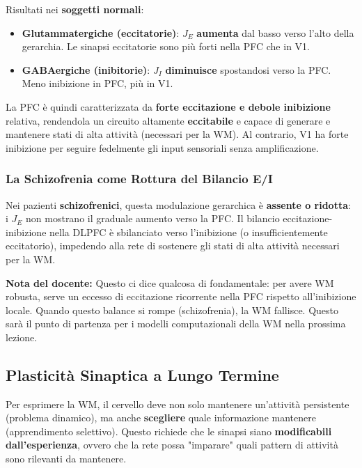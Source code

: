 Risultati nei \textbf{soggetti normali}:
\begin{itemize}
    \item \textbf{Glutammatergiche (eccitatorie)}: $J_E$ \textbf{aumenta} dal basso verso l'alto della gerarchia. Le sinapsi eccitatorie sono più forti nella PFC che in V1.
    \item \textbf{GABAergiche (inibitorie)}: $J_I$ \textbf{diminuisce} spostandosi verso la PFC. Meno inibizione in PFC, più in V1.
\end{itemize}

La PFC è quindi caratterizzata da \textbf{forte eccitazione e debole inibizione} relativa, rendendola un circuito altamente \textbf{eccitabile} e capace di generare e mantenere stati di alta attività (necessari per la WM). Al contrario, V1 ha forte inibizione per seguire fedelmente gli input sensoriali senza amplificazione.

\subsubsection{La Schizofrenia come Rottura del Bilancio E/I}

Nei pazienti \textbf{schizofrenici}, questa modulazione gerarchica è \textbf{assente o ridotta}: i $J_E$ non mostrano il graduale aumento verso la PFC. Il bilancio eccitazione-inibizione nella DLPFC è sbilanciato verso l'inibizione (o insufficientemente eccitatorio), impedendo alla rete di sostenere gli stati di alta attività necessari per la WM.

\begin{tcolorbox}[colback=gray!5, colframe=gray!40, arc=2mm, boxrule=0.5pt]
\textbf{Nota del docente:} Questo ci dice qualcosa di fondamentale: per avere WM robusta, serve un eccesso di eccitazione ricorrente nella PFC rispetto all'inibizione locale. Quando questo balance si rompe (schizofrenia), la WM fallisce. Questo sarà il punto di partenza per i modelli computazionali della WM nella prossima lezione.
\end{tcolorbox}


\subsection{Plasticità Sinaptica a Lungo Termine}

Per esprimere la WM, il cervello deve non solo mantenere un'attività persistente (problema dinamico), ma anche \textbf{scegliere} quale informazione mantenere (apprendimento selettivo). Questo richiede che le sinapsi siano \textbf{modificabili dall'esperienza}, ovvero che la rete possa "imparare" quali pattern di attività sono rilevanti da mantenere.

